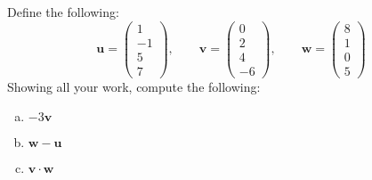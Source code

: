 \documentclass[11pt,letterpaper]{article}
\begin{document}

 Define the following:
	\[
	\mathbf{u}= \begin{pmatrix} 1 \\ -1 \\ 5 \\ 7 \end{pmatrix}, \qquad
	\mathbf{v}= \begin{pmatrix} 0 \\ 2 \\ 4 \\ -6 \end{pmatrix}, \qquad
	\mathbf{w}= \begin{pmatrix} 8 \\ 1 \\ 0 \\ 5 \end{pmatrix}
	\]
Showing all your work, compute the following:
	\begin{enumerate}[(a)]
	\item $-3\mathbf{v}$
	\item $\mathbf{w} - \mathbf{u}$
	\item $\mathbf{v} \cdot \mathbf{w}$
	\end{enumerate} \pspace
\end{document}
